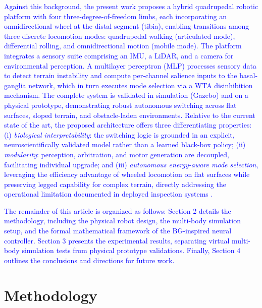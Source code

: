 \documentclass[preprint,12pt]{elsarticle}
\newcommand{\revblue}[1]{\textcolor{blue}{#1}}
\begin{document}
\revblue{Against this background, the present work proposes a hybrid quadrupedal robotic platform with four three-degree-of-freedom limbs, each incorporating an omnidirectional wheel at the distal segment (tibia), enabling transitions among three discrete locomotion modes: quadrupedal walking (articulated mode), differential rolling, and omnidirectional motion (mobile mode). The platform integrates a sensory suite comprising an IMU, a LiDAR, and a camera for environmental perception. A multilayer perceptron (MLP) processes sensory data to detect terrain instability and compute per-channel salience inputs to the basal-ganglia network, which in turn executes mode selection via a WTA disinhibition mechanism. The complete system is validated in simulation (Gazebo) and on a physical prototype, demonstrating robust autonomous switching across flat surfaces, sloped terrain, and obstacle-laden environments. Relative to the current state of the art, the proposed architecture offers three differentiating properties: (i) \emph{biological interpretability}: the switching logic is grounded in an explicit, neuroscientifically validated model rather than a learned black-box policy; (ii) \emph{modularity}: perception, arbitration, and motor generation are decoupled, facilitating individual upgrade; and (iii) \emph{autonomous energy-aware mode selection}, leveraging the efficiency advantage of wheeled locomotion on flat surfaces while preserving legged capability for complex terrain, directly addressing the operational limitation documented in deployed inspection systems \citep{Hutter2017ANYmal,Tranzatto2022CERBERUS}.}

\revblue{The remainder of this article is organized as follows: Section 2 details the methodology, including the physical robot design, the multi-body simulation setup, and the formal mathematical framework of the BG-inspired neural controller. Section 3 presents the experimental results, separating virtual multi-body simulation tests from physical prototype validations. Finally, Section 4 outlines the conclusions and directions for future work.}

\section{Methodology}
\end{document}
